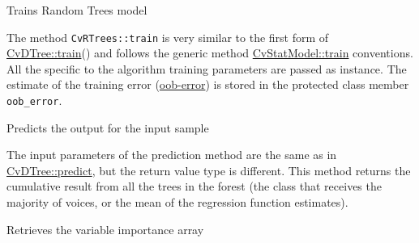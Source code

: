 
Trains Random Trees model


The method \texttt{CvRTrees::train} is very similar to the first form of \href{#CvDTree.3A.3Atrain}{CvDTree::train}() and follows the generic method \href{#CvStatModel.3A.3Atrain}{CvStatModel::train} conventions. All the specific to the algorithm training parameters are passed as  instance. The estimate of the training error (\href{#RTreesOOBerror}{oob-error}) is stored in the protected class member \texttt{oob\_error}.



Predicts the output for the input sample


The input parameters of the prediction method are the same as in \href{#CvDTree.3A.3Apredict}{CvDTree::predict}, but the return value type is different. This method returns the cumulative result from all the trees in the forest (the class that receives the majority of voices, or the mean of the regression function estimates).



Retrieves the variable importance array


